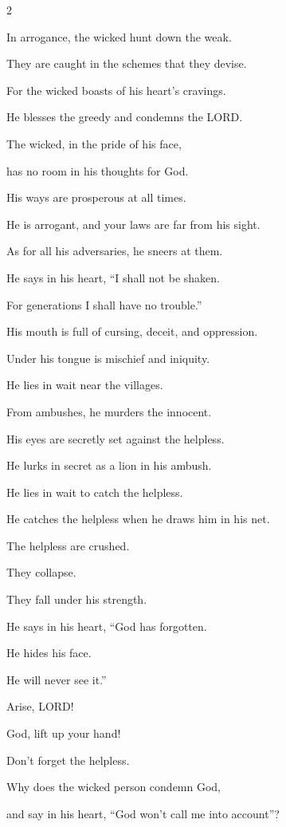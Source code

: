 \begin{multicols}{2}
	
	\myverse{}In arrogance, the wicked hunt down the weak.
	
	They are caught in the schemes that they devise.
	
	
	\myverse{}For the wicked boasts of his heart’s cravings.
	
	He blesses the greedy and condemns the LORD.
	
	
	\myverse{}The wicked, in the pride of his face,
	
	has no room in his thoughts for God.
	
	
	\myverse{}His ways are prosperous at all times.
	
	He is arrogant, and your laws are far from his sight.
	
	As for all his adversaries, he sneers at them.
	
	
	\myverse{}He says in his heart, “I shall not be shaken.
	
	For generations I shall have no trouble.”
	
	
	\myverse{}His mouth is full of cursing, deceit, and oppression.
	
	Under his tongue is mischief and iniquity.
	
	
	\myverse{}He lies in wait near the villages.
	
	From ambushes, he murders the innocent.
	
	His eyes are secretly set against the helpless.
	
	
	\myverse{}He lurks in secret as a lion in his ambush.
	
	He lies in wait to catch the helpless.
	
	He catches the helpless when he draws him in his net.
	
	
	\myverse{}The helpless are crushed.
	
	They collapse.
	
	They fall under his strength.
	
	
	\myverse{}He says in his heart, “God has forgotten.
	
	He hides his face.
	
	He will never see it.”
	
	\vspace{\baselineskip}
	
	\myverse{}Arise, LORD!
	
	God, lift up your hand!
	
	Don’t forget the helpless.
	
	
	\myverse{}Why does the wicked person condemn God,
	
	and say in his heart, “God won’t call me into account”?
	

\end{multicols}
